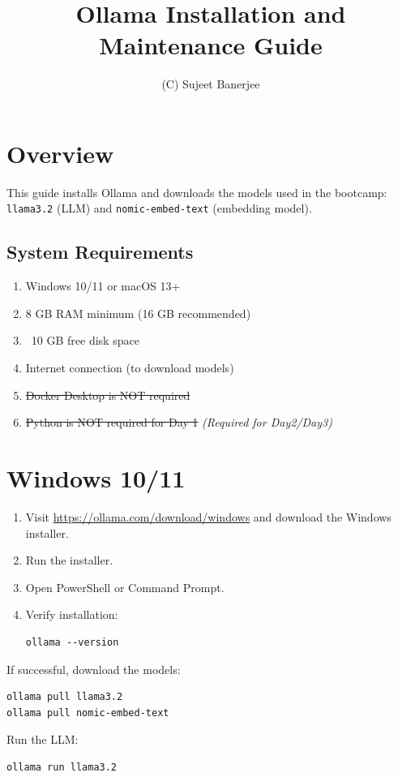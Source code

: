 \documentclass{article}
\title{Ollama Installation and Maintenance Guide}
\author{(C) Sujeet Banerjee}
\date{}
\begin{document}
\maketitle

\section*{Overview}
This guide installs Ollama and downloads the models used in the bootcamp: \texttt{llama3.2} (LLM) and \texttt{nomic-embed-text} (embedding model).

\subsection*{System Requirements}

\begin{enumerate}
    \item Windows 10/11 or macOS 13+
    \item 8 GB RAM minimum (16 GB recommended)
    \item ~10 GB free disk space
    \item Internet connection (to download models)
    \item \sout{Docker Desktop is NOT required}
    \item \sout{Python is NOT required for Day 1} 
    \textit{(Required for Day2/Day3)}
\end{enumerate}


\section*{Windows 10/11}
\begin{enumerate}
    \item Visit \url{https://ollama.com/download/windows} and download the Windows installer.
    \item Run the installer.
    \item Open PowerShell or Command Prompt.
    \item Verify installation:
    \begin{verbatim}
ollama --version
    \end{verbatim}
\end{enumerate}

If successful, download the models:
\begin{verbatim}
ollama pull llama3.2
ollama pull nomic-embed-text
\end{verbatim}

Run the LLM:
\begin{verbatim}
ollama run llama3.2
\end{verbatim}
\end{document}
